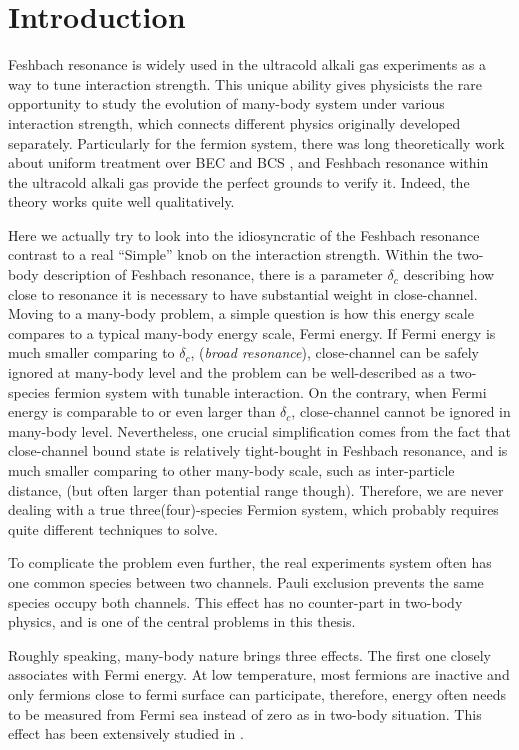 
\chapter{Introduction}
Feshbach resonance is widely used in the ultracold alkali gas experiments as a way to tune interaction strength.  This unique ability gives physicists the rare opportunity to study the evolution of many-body system under various interaction strength, which connects different physics originally developed separately.  Particularly for the fermion system, there was long theoretically work about uniform treatment over BEC and BCS \cite{Eagle,LeggettCrossover,Nozieres,RanderiaBEC}, and Feshbach resonance within the ultracold alkali gas provide the perfect grounds to verify it.  Indeed,  the theory works quite well  qualitatively.  

Here we actually try to look into the idiosyncratic of the Feshbach resonance contrast to a real ``Simple'' knob on the interaction strength.  Within the two-body description of Feshbach resonance, there is a parameter $\delta_c$ describing how close to resonance it is necessary to have substantial weight in close-channel.  Moving to a many-body problem, a simple question is how this energy scale compares to a typical many-body energy scale, Fermi energy.  If Fermi energy is much smaller comparing to $\delta_c$, (\emph{broad resonance}), close-channel can be safely ignored at many-body level and the problem can be well-described as a two-species fermion system with tunable interaction.  On the contrary, when Fermi energy is  comparable to or even larger than $\delta_c$, close-channel cannot be ignored in many-body level.  Nevertheless, one crucial simplification comes from  the fact that close-channel bound state is relatively tight-bought in  Feshbach resonance, and is much smaller comparing to other many-body scale, such as inter-particle distance, (but often larger than potential range though).  Therefore, we are never dealing with a true three(four)-species Fermion system, which probably requires quite different techniques to solve.

To complicate the problem even further, the real experiments system often has one common species between two channels.  Pauli exclusion prevents the same species occupy both channels.  This effect has no counter-part in two-body physics, and is one of the central problems in this thesis. 

Roughly speaking, many-body nature brings three effects.  The first one closely associates with Fermi energy.  At low temperature, most fermions are inactive and only fermions close to fermi surface can participate, therefore, energy often needs to be measured from Fermi sea instead of zero as in two-body situation.  This effect has been extensively studied in \cite{GurarieNarrow}.

